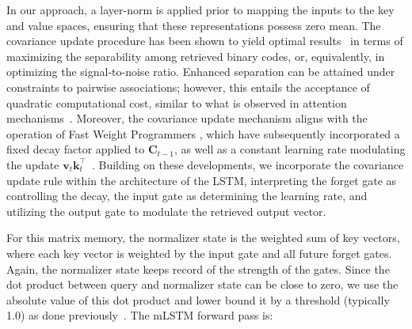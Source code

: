 In our approach, a layer-norm is applied prior to mapping the inputs to the key and value spaces, ensuring that these representations possess zero mean. The covariance update procedure has been shown to yield optimal results~\citep{Dayan:91} in terms of maximizing the separability among retrieved binary codes, or, equivalently, in optimizing the signal-to-noise ratio. Enhanced separation can be attained under constraints to pairwise associations; however, this entails the acceptance of quadratic computational cost, similar to what is observed in attention mechanisms~\citep{Krotov:16,Krotov:17,Ramsauer:21}. Moreover, the covariance update mechanism aligns with the operation of Fast Weight Programmers \citep{Schmidhuber:92ncfastweights,Schlag:21}, which have subsequently incorporated a fixed decay factor applied to $\mathbf{C}_{t-1}$, as well as a constant learning rate modulating the update $\mathbf{v}_{t} \mathbf{k}_t ^\top$~\citep{Ba:16}. Building on these developments, we incorporate the covariance update rule within the architecture of the LSTM, interpreting the forget gate as controlling the decay, the input gate as determining the learning rate, and utilizing the output gate to modulate the retrieved output vector.

For this matrix memory, the normalizer state is the weighted sum of key vectors, where each key vector is weighted by the input gate and all future forget gates. Again, the normalizer state keeps record of the strength of the gates. Since the dot product between query and normalizer state can be close to zero, we use the absolute value of this dot product and lower bound it by a threshold (typically 1.0) as done previously~\citep{Sun:23arxiv}. The mLSTM forward pass is:

